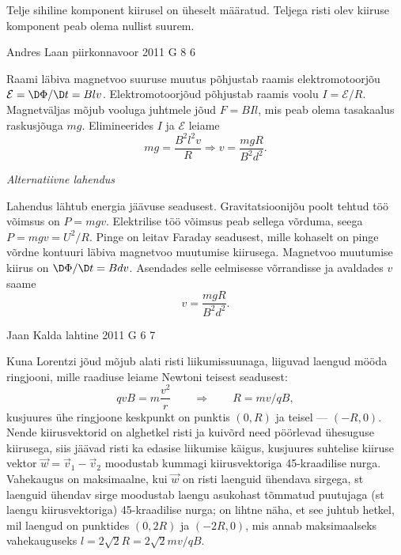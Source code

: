 \documentclass[11pt]{article}
\begin{document}
{{Telje sihiline komponent kiirusel on üheselt määratud. Teljega risti olev kiiruse komponent peab olema nullist suurem.
\fi
}

{Andres Laan} %
{piirkonnavoor} %
{2011} %
{G 8} %
{6} %
{

\ifSolution
Raami läbiva magnetvoo suuruse muutus põhjustab raamis elektromotoorjõu $\mathcal{E} = \D\Phi/\D t = Blv$. Elektromotoorjõud põhjustab raamis voolu $I = \mathcal{E}/R$. Magnetväljas mõjub vooluga juhtmele jõud $F = BIl$, mis peab olema tasakaalus raskusjõuga $mg$. Elimineerides $I$ ja $\mathcal{E}$ leiame
\[
m g=\frac{B^{2} l^{2} v}{R} \Rightarrow v=\frac{m g R}{B^{2} d^{2}}.
\]

\medskip

\emph{Alternatiivne lahendus}

Lahendus lähtub energia jäävuse seadusest. Gravitatsioonijõu poolt tehtud töö võimsus on $P = mgv$. Elektrilise töö võimsus peab sellega võrduma, seega $P = mgv = U^2/R$. Pinge on leitav Faraday seadusest, mille kohaselt on pinge võrdne kontuuri läbiva magnetvoo muutumise kiirusega. Magnetvoo muutumise kiirus on $\D\Phi/\D t = Bd v$. Asendades selle eelmisesse võrrandisse ja avaldades $v$ saame 
\[
v=\frac{m g R}{B^{2} d^{2}}.
\] 
\fi
}

{Jaan Kalda} %
{lahtine} %
{2011} %
{G 6} %
{7} %
{

\ifSolution
Kuna Lorentzi jõud mõjub alati risti liikumissuunaga, liiguvad laengud mööda ringjooni, mille raadiuse leiame Newtoni teisest seadusest:
\[
qvB=m\frac{v^2}{r} \qquad \Rightarrow \qquad R=mv/qB,
\]
kusjuures ühe ringjoone keskpunkt on punktis $(0,R)$ ja teisel --- $(-R,0)$.
Nende kiirusvektorid on alghetkel risti ja kuivõrd need pöörlevad ühesuguse kiirusega, siis jäävad risti ka edasise liikumise käigus,
kusjuures suhtelise kiiruse vektor $\vec w= \vec v_1-\vec v_2$ moodustab kummagi kiirusvektoriga 45-kraadilise nurga. Vahekaugus on
maksimaalne, kui $\vec w$ on risti laenguid ühendava sirgega, st laenguid ühendav sirge moodustab laengu asukohast tõmmatud
puutujaga (st laengu kiirusvektoriga) 45-kraadilise nurga; on lihtne näha, et see juhtub hetkel, mil laengud on punktides $(0,2R)$ ja $(-2R,0)$, mis
annab maksimaalseks vahekauguseks $l=2\sqrt 2 R =2\sqrt 2mv/qB$.

\vspace{0.5\baselineskip}

}}
\end{document}
